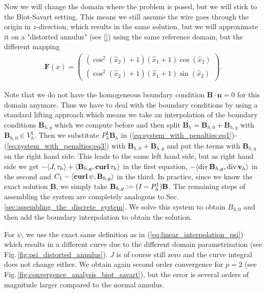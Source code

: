 \documentclass[../master_thesis.tex]{subfiles}
\begin{document}
Now we will change the domain where the problem is posed, but we will 
stick to the Biot-Savart setting. This means we still assume the wire 
goes through the origin in $z$-direction, which results in the same solution, 
but we will approximate it
on a "distorted annulus" (see \ref{}) using the same reference domain, but the different mapping 
\begin{align*}
    \mathbf{F}(\hat{x}) = \begin{pmatrix}
        (\cos^2(\hat{x}_2 ) + 1 )(\hat{x}_1 + 1)\cos(\hat{x}_2 ) 
        \\ (\cos^2(\hat{x}_2 ) + 1 ) (\hat{x}_1 + 1)\sin(\hat{x}_2 ) 
    \end{pmatrix}.
\end{align*}

Note that we do not have 
the homogeneous boundary condition
$\mathbf{B}\cdot \mathbf{n} = 0$ for this domain anymore. Thus we have to deal with the boundary conditions 
by using a standard lifting approach which means we take an interpolation of the boundary conditions 
$\mathbf{B}_{h,g}$ which we compute before and then split
$\mathbf{B}_{h} = \mathbf{B}_{h,0} + \mathbf{B}_{h,g}$ with $\mathbf{B}_{h,0}\in V_h^1$.
Then we substitute $P_h^1 \mathbf{B}_h$ in 
(\ref{eq:system_with_penalties:eq1})-(\ref{eq:system_with_penalties:eq3}) 
with $\mathbf{B}_{h,0} + \mathbf{B}_{h,g}$ and put the terms with  
$\mathbf{B}_{h,g}$ on the right hand side. 
This leads to the same left hand side, but as right hand side we get
$-\langle J, \tau_h \rangle + \langle \mathbf{B}_{h,g}, \veccurl \tau_h \rangle$ in 
the first equation, $-\langle\operatorname{div}  \mathbf{B}_{h,g} ,\operatorname{div} \mathbf{v}_{h} \rangle$
in the second and $C_1 - \langle\veccurl \psi,\mathbf{B}_{h,g} \rangle$ 
in the third. In practice, since we know the exact solution $\mathbf{B}$, we simply take 
$\mathbf{B}_{h,g} \vcentcolon= (I-P^1_h)\mathbf{B}$. The remaining steps of assembling 
the system are completely analogous to Sec.\,\ref{sec:assembling_the_discrete_system}. 
We solve this system to obtain $B_{h,0}$ and then add the boundary 
interpolation to obtain the solution.

For $\psi$, we use the exact same definition as in (\ref{eq:linear_interpolation_psi}) 
which results in a different 
curve due to the different domain parametrization (see Fig.\,\ref{fig:psi_distorted_annulus}). $J$ is of course
still zero and the curve integral does not change either. We obtain again 
second order convergence for $p=2$ (see Fig.\,\ref{fig:convergence_analysis_biot_savart}), 
but the error is several orders of magnitude larger compared to the normal annulus. 
\end{document}

